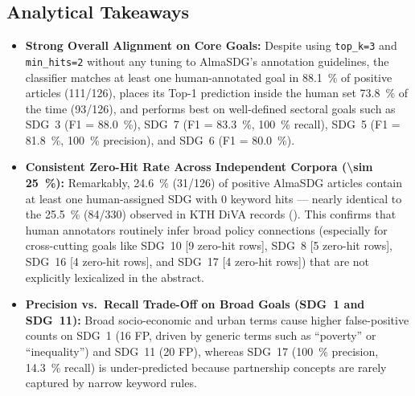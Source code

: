 \subsection{Analytical Takeaways}
\begin{itemize}
    \item \textbf{Strong Overall Alignment on Core Goals:} Despite using \texttt{top\_k=3} and \texttt{min\_hits=2} without any tuning to AlmaSDG's annotation guidelines, the classifier matches at least one human-annotated goal in \qty{88.1}{\percent} of positive articles (\num{111}/\num{126}), places its Top-1 prediction inside the human set \qty{73.8}{\percent} of the time (\num{93}/\num{126}), and performs best on well-defined sectoral goals such as \gls{SDG}~3 (F1 = \qty{88.0}{\percent}), \gls{SDG}~7 (F1 = \qty{83.3}{\percent}, \qty{100}{\percent} recall), \gls{SDG}~5 (F1 = \qty{81.8}{\percent}, \qty{100}{\percent} precision), and \gls{SDG}~6 (F1 = \qty{80.0}{\percent}).

    \item \textbf{Consistent Zero-Hit Rate Across Independent Corpora (\qty{\sim 25}{\percent}):} Remarkably, \qty{24.6}{\percent} (\num{31}/\num{126}) of positive AlmaSDG articles contain at least one human-assigned \gls{SDG} with \num{0} keyword hits --- nearly identical to the \qty{25.5}{\percent} (\num{84}/\num{330}) observed in \gls{KTH} \gls{DiVA} records (). This confirms that human annotators routinely infer broad policy connections (especially for cross-cutting goals like \gls{SDG}~10 [\num{9} zero-hit rows], \gls{SDG}~8 [\num{5} zero-hit rows], \gls{SDG}~16 [\num{4} zero-hit rows], and \gls{SDG}~17 [\num{4} zero-hit rows]) that are not explicitly lexicalized in the abstract.

    \item \textbf{Precision vs.\ Recall Trade-Off on Broad Goals (\gls{SDG}~1 and \gls{SDG}~11):} Broad socio-economic and urban terms cause higher false-positive counts on \gls{SDG}~1 (\num{16} FP, driven by generic terms such as \enquote{poverty} or \enquote{inequality}) and \gls{SDG}~11 (\num{20} FP), whereas \gls{SDG}~17 (\qty{100}{\percent} precision, \qty{14.3}{\percent} recall) is under-predicted because partnership concepts are rarely captured by narrow keyword rules.


\end{itemize}
